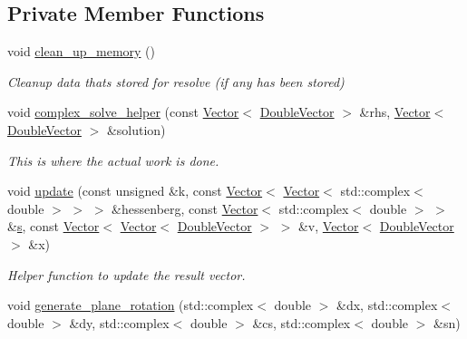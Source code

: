 \subsection*{Private Member Functions}
\begin{DoxyCompactItemize}
\item 
void \hyperlink{classoomph_1_1ComplexGMRES_a946b88bc1392180c56909b739bfa7b3c}{clean\+\_\+up\+\_\+memory} ()
\begin{DoxyCompactList}\small\item\em Cleanup data that\textquotesingle{}s stored for resolve (if any has been stored) \end{DoxyCompactList}\item 
void \hyperlink{classoomph_1_1ComplexGMRES_a848721022a08fde4b2182a143f287ded}{complex\+\_\+solve\+\_\+helper} (const \hyperlink{classoomph_1_1Vector}{Vector}$<$ \hyperlink{classoomph_1_1DoubleVector}{Double\+Vector} $>$ \&rhs, \hyperlink{classoomph_1_1Vector}{Vector}$<$ \hyperlink{classoomph_1_1DoubleVector}{Double\+Vector} $>$ \&solution)
\begin{DoxyCompactList}\small\item\em This is where the actual work is done. \end{DoxyCompactList}\item 
void \hyperlink{classoomph_1_1ComplexGMRES_a0c6df8b6c50a0ccd344a62654b1411d0}{update} (const unsigned \&k, const \hyperlink{classoomph_1_1Vector}{Vector}$<$ \hyperlink{classoomph_1_1Vector}{Vector}$<$ std\+::complex$<$ double $>$ $>$ $>$ \&hessenberg, const \hyperlink{classoomph_1_1Vector}{Vector}$<$ std\+::complex$<$ double $>$ $>$ \&\hyperlink{cfortran_8h_ab7123126e4885ef647dd9c6e3807a21c}{s}, const \hyperlink{classoomph_1_1Vector}{Vector}$<$ \hyperlink{classoomph_1_1Vector}{Vector}$<$ \hyperlink{classoomph_1_1DoubleVector}{Double\+Vector} $>$ $>$ \&v, \hyperlink{classoomph_1_1Vector}{Vector}$<$ \hyperlink{classoomph_1_1DoubleVector}{Double\+Vector} $>$ \&x)
\begin{DoxyCompactList}\small\item\em Helper function to update the result vector. \end{DoxyCompactList}\item 
void \hyperlink{classoomph_1_1ComplexGMRES_a07183636586d7d30fcde380ef88e5fe6}{generate\+\_\+plane\+\_\+rotation} (std\+::complex$<$ double $>$ \&dx, std\+::complex$<$ double $>$ \&dy, std\+::complex$<$ double $>$ \&cs, std\+::complex$<$ double $>$ \&sn)

\end{DoxyCompactItemize}
